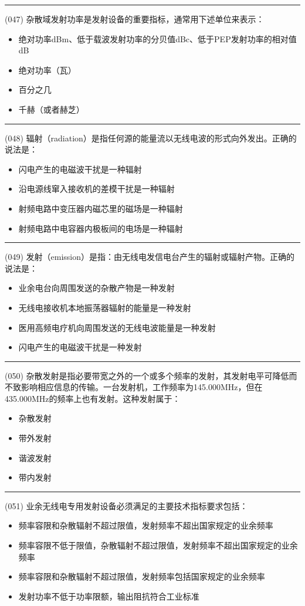 \documentclass[twocolumn]{ctexart}  %
\begin{document}
\noindent\rule{0.5\textwidth}{1pt}
\heiti (047) 杂散域发射功率是发射设备的重要指标，通常用下述单位来表示： \songti {\color{gray} [LK0118] }
\begin{itemize}
	\item  绝对功率dBm、低于载波发射功率的分贝值dBc、低于PEP发射功率的相对值dB
	\item  绝对功率（瓦）
	\item  百分之几
	\item  千赫（或者赫芝）
\end{itemize}


\noindent\rule{0.5\textwidth}{1pt}
\heiti (048) 辐射（radiation）是指任何源的能量流以无线电波的形式向外发出。正确的说法是： \songti {\color{gray} [LK0125] }
\begin{itemize}
	\item  闪电产生的电磁波干扰是一种辐射
	\item  沿电源线窜入接收机的差模干扰是一种辐射
	\item  射频电路中变压器内磁芯里的磁场是一种辐射
	\item  射频电路中电容器内极板间的电场是一种辐射
\end{itemize}


\noindent\rule{0.5\textwidth}{1pt}
\heiti (049) 发射（emission）是指：由无线电发信电台产生的辐射或辐射产物。正确的说法是： \songti {\color{gray} [LK0126] }
\begin{itemize}
	\item  业余电台向周围发送的杂散产物是一种发射
	\item  无线电接收机本地振荡器辐射的能量是一种发射
	\item  医用高频电疗机向周围发送的无线电波能量是一种发射
	\item  闪电产生的电磁波干扰是一种发射
\end{itemize}


\noindent\rule{0.5\textwidth}{1pt}
\heiti (050) 杂散发射是指必要带宽之外的一个或多个频率的发射，其发射电平可降低而不致影响相应信息的传输。一台发射机，工作频率为145.000MHz，但在435.000MHz的频率上也有发射。这种发射属于： \songti {\color{gray} [LK0137] }
\begin{itemize}
	\item  杂散发射
	\item  带外发射
	\item  谐波发射
	\item  带内发射
\end{itemize}


\noindent\rule{0.5\textwidth}{1pt}
\heiti (051) 业余无线电专用发射设备必须满足的主要技术指标要求包括： \songti {\color{gray} [LK0139] }
\begin{itemize}
	\item  频率容限和杂散辐射不超过限值，发射频率不超出国家规定的业余频率
	\item  频率容限不低于限值，杂散辐射不超过限值，发射频率不超出国家规定的业余频率
	\item  频率容限和杂散辐射不超过限值，发射频率包括国家规定的业余频率
	\item  发射功率不低于功率限额，输出阻抗符合工业标准
\end{itemize}
\end{document}
